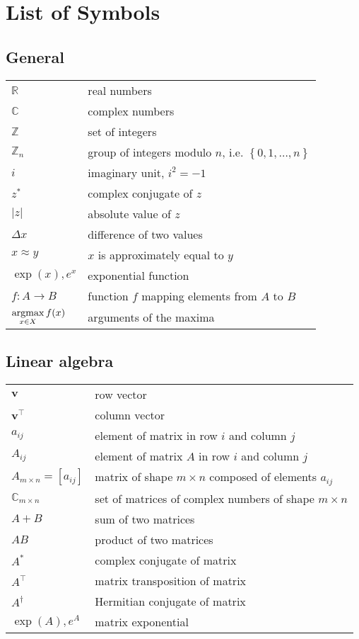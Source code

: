 \documentclass[../main.tex]{subfiles}
\begin{document}
\chapter*{List of Symbols}

\renewcommand{\arraystretch}{1.33}

\section*{General}
\hspace*{-0.275cm}
\begin{tabular}{p{2.2cm}l}
    $\mathbb{R}$ & real numbers \\
    $\mathbb{C}$ & complex numbers \\
    $\mathbb{Z}$ & set of integers \\
    $\mathbb{Z}_n$ & group of integers modulo $n$, i.e. $\left\{0, 1, \ldots, n\right\}$ \\
    $i$ & imaginary unit, $i^2 = -1$ \\
    $z^*$ & complex conjugate of $z$ \\
    $\left|z\right|$ & absolute value of $z$ \\
    $\Delta x$ & difference of two values \\
    $x \approx y$ & $x$ is approximately equal to $y$ \\
    $\exp(x), e^x$ & exponential function \\
    $f : A \to B$ & function $f$ mapping elements from $A$ to $B$ \\
    $\displaystyle\operatorname*{argmax}_{x \in X} f(x)$ & arguments of the maxima \\
\end{tabular}

\section*{Linear algebra}
\hspace*{-0.275cm}
\begin{tabular}{p{2.2cm}l}
    $\mathbf{v}$ & row vector \\
    $\mathbf{v}^\top$ & column vector \\
    $a_{ij}$ & element of matrix in row $i$ and column $j$ \\
    $A_{ij}$ & element of matrix $A$ in row $i$ and column $j$ \\
    $A_{m \times n} = \left[a_{ij}\right]$ & matrix of shape $m \times n$ composed of elements $a_{ij}$ \\
    $\mathbb{C}_{m \times n}$ & set of matrices of complex numbers of shape $m \times n$ \\
    $A + B$ & sum of two matrices \\
    $AB$ & product of two matrices \\
    $A^*$ & complex conjugate of matrix \\
    $A^\top$ & matrix transposition of matrix \\
    $A^\dag$ & Hermitian conjugate of matrix \\
    $\exp(A), e^A$ & matrix exponential \\
\end{tabular}
\end{document}
